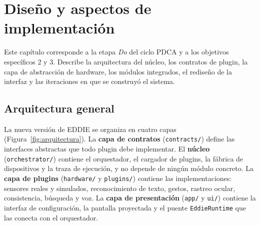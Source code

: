 \chapter{Diseño y aspectos de implementación}
\label{cap:diseno}

Este capítulo corresponde a la etapa \textit{Do} del ciclo PDCA y a los objetivos específicos 2 y 3. Describe la arquitectura del núcleo, los contratos de plugin, la capa de abstracción de hardware, los módulos integrados, el rediseño de la interfaz y las iteraciones en que se construyó el sistema.

\section{Arquitectura general}

La nueva versión de EDDIE se organiza en cuatro capas (Figura~\ref{fig:arquitectura}). La \textbf{capa de contratos} (\texttt{contracts/}) define las interfaces abstractas que todo plugin debe implementar. El \textbf{núcleo} (\texttt{orchestrator/}) contiene el orquestador, el cargador de plugins, la fábrica de dispositivos y la traza de ejecución, y no depende de ningún módulo concreto. La \textbf{capa de plugins} (\texttt{hardware/} y \texttt{plugins/}) contiene las implementaciones: sensores reales y simulados, reconocimiento de texto, gestos, rastreo ocular, consistencia, búsqueda y voz. La \textbf{capa de presentación} (\texttt{app/} y \texttt{ui/}) contiene la interfaz de configuración, la pantalla proyectada y el puente \texttt{EddieRuntime} que las conecta con el orquestador.

